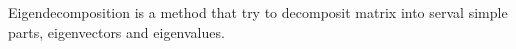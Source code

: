 %

Eigendecomposition is a method that try to decomposit matrix into serval simple parts,
  eigenvectors and eigenvalues.

